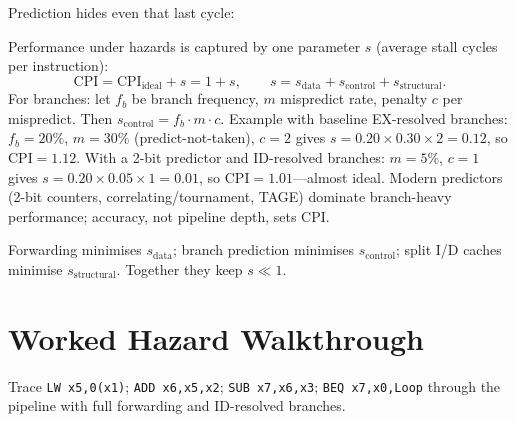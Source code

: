 Prediction hides even that last cycle:

\begin{center}
\end{center}

Performance under hazards is captured by one parameter $s$ (average stall cycles per instruction):
\[ \text{CPI}= \text{CPI}_{\text{ideal}} + s = 1 + s,\qquad s = s_{\text{data}}+s_{\text{control}}+s_{\text{structural}}. \]
For branches: let $f_b$ be branch frequency, $m$ mispredict rate, penalty $c$ per mispredict.
Then $s_{\text{control}}=f_b\cdot m\cdot c$.
Example with baseline EX-resolved branches: $f_b=20\%$, $m=30\%$ (predict-not-taken), $c=2$ gives $s=0.20\times0.30\times2=0.12$, so $\text{CPI}=1.12$.
With a 2-bit predictor and ID-resolved branches: $m=5\%$, $c=1$ gives $s=0.20\times0.05\times1=0.01$, so $\text{CPI}=1.01$---almost ideal.
Modern predictors (2-bit counters, correlating/tournament, TAGE) dominate branch-heavy performance; accuracy, not pipeline depth, sets CPI.

Forwarding minimises $s_{\text{data}}$; branch prediction minimises $s_{\text{control}}$; split I/D caches minimise $s_{\text{structural}}$. Together they keep $s\ll1$.

\section{Worked Hazard Walkthrough}
Trace \texttt{LW x5,0(x1)}; \texttt{ADD x6,x5,x2}; \texttt{SUB x7,x6,x3}; \texttt{BEQ x7,x0,Loop} through the pipeline with full forwarding and ID-resolved branches.


